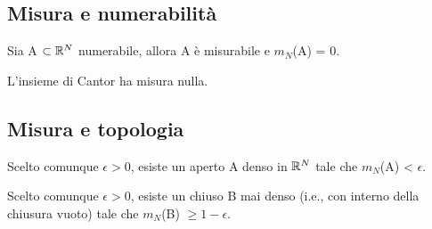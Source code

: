 \documentclass[Completo.tex]{subfiles}
\begin{document}
\subsection{Misura e numerabilità}
\begin{Prop}
	Sia A $\sset \bb[R]^{N}$ numerabile, allora A è misurabile e $m_N$(A) = 0.
\end{Prop}
\begin{Prop}
	L'insieme di Cantor ha misura nulla.
\end{Prop}
\subsection{Misura e topologia}
\begin{Prop}
	Scelto comunque $\epsilon > 0$, esiste un aperto A denso in $\bb[R]^{N}$ tale che $m_N$(A) < $\epsilon$.
\end{Prop}
\begin{Prop}
	Scelto comunque $\epsilon > 0$, esiste un chiuso B mai denso (i.e., con interno della chiusura vuoto) tale che $m_N$(B) $\geq 1-\epsilon$.
\end{Prop}
\end{document}
